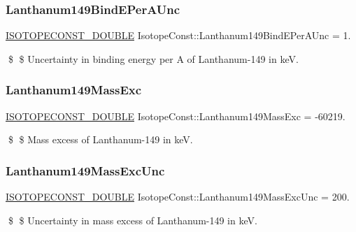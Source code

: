 \subsubsection{\texorpdfstring{Lanthanum149\+Bind\+E\+Per\+A\+Unc}{Lanthanum149BindEPerAUnc}}
{\footnotesize\ttfamily \mbox{\hyperlink{group___isotope_const-_macros_ga8f45a7272ce02c0b4c65c44636ed719a}{I\+S\+O\+T\+O\+P\+E\+C\+O\+N\+S\+T\+\_\+\+D\+O\+U\+B\+LE}} Isotope\+Const\+::\+Lanthanum149\+Bind\+E\+Per\+A\+Unc = 1.}

\$ \$ Uncertainty in binding energy per A of Lanthanum-\/149 in keV. \mbox{\label{group___isotope_const-_lanthanum-_la149_ga6d27c0c0c2793a720b7c721220d2b591}} 
\subsubsection{\texorpdfstring{Lanthanum149\+Mass\+Exc}{Lanthanum149MassExc}}
{\footnotesize\ttfamily \mbox{\hyperlink{group___isotope_const-_macros_ga8f45a7272ce02c0b4c65c44636ed719a}{I\+S\+O\+T\+O\+P\+E\+C\+O\+N\+S\+T\+\_\+\+D\+O\+U\+B\+LE}} Isotope\+Const\+::\+Lanthanum149\+Mass\+Exc = -\/60219.}

\$ \$ Mass excess of Lanthanum-\/149 in keV. \mbox{\label{group___isotope_const-_lanthanum-_la149_ga31b5334b3f2780e34e27c4e5ad50706b}} 
\subsubsection{\texorpdfstring{Lanthanum149\+Mass\+Exc\+Unc}{Lanthanum149MassExcUnc}}
{\footnotesize\ttfamily \mbox{\hyperlink{group___isotope_const-_macros_ga8f45a7272ce02c0b4c65c44636ed719a}{I\+S\+O\+T\+O\+P\+E\+C\+O\+N\+S\+T\+\_\+\+D\+O\+U\+B\+LE}} Isotope\+Const\+::\+Lanthanum149\+Mass\+Exc\+Unc = 200.}

\$ \$ Uncertainty in mass excess of Lanthanum-\/149 in keV. \mbox{\label{group___isotope_const-_lanthanum-_la149_gaab5f75ee5c44823918014e8c7a38b0d0}} 
